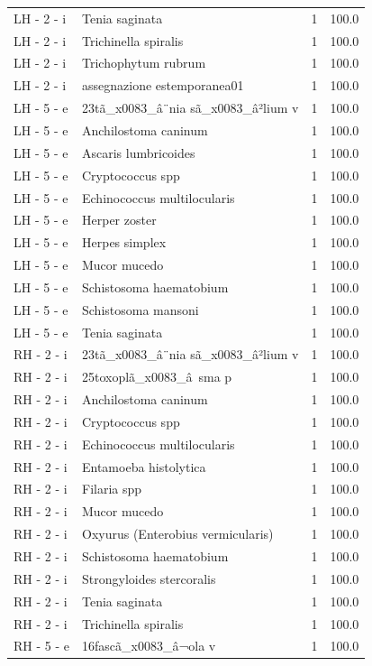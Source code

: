 \documentclass[a4paper,11pt]{article}
\begin{document}
\begin{footnotesize}
\begin{longtable}{p{3.5cm}p{7.5cm}rr}
LH - 2 - i & Tenia saginata & 1 & 100.0 \\
LH - 2 - i & Trichinella spiralis & 1 & 100.0 \\
LH - 2 - i & Trichophytum rubrum & 1 & 100.0 \\
LH - 2 - i & assegnazione estemporanea01 & 1 & 100.0 \\
LH - 5 - e & 23tã\_x0083\_â¨nia sã\_x0083\_â²lium v & 1 & 100.0 \\
LH - 5 - e & Anchilostoma caninum & 1 & 100.0 \\
LH - 5 - e & Ascaris lumbricoides & 1 & 100.0 \\
LH - 5 - e & Cryptococcus spp & 1 & 100.0 \\
LH - 5 - e & Echinococcus multilocularis & 1 & 100.0 \\
LH - 5 - e & Herper zoster & 1 & 100.0 \\
LH - 5 - e & Herpes simplex & 1 & 100.0 \\
LH - 5 - e & Mucor mucedo & 1 & 100.0 \\
LH - 5 - e & Schistosoma haematobium & 1 & 100.0 \\
LH - 5 - e & Schistosoma mansoni & 1 & 100.0 \\
LH - 5 - e & Tenia saginata & 1 & 100.0 \\
RH - 2 - i & 23tã\_x0083\_â¨nia sã\_x0083\_â²lium v & 1 & 100.0 \\
RH - 2 - i & 25toxoplã\_x0083\_â sma p & 1 & 100.0 \\
RH - 2 - i & Anchilostoma caninum & 1 & 100.0 \\
RH - 2 - i & Cryptococcus spp & 1 & 100.0 \\
RH - 2 - i & Echinococcus multilocularis & 1 & 100.0 \\
RH - 2 - i & Entamoeba histolytica & 1 & 100.0 \\
RH - 2 - i & Filaria spp & 1 & 100.0 \\
RH - 2 - i & Mucor mucedo & 1 & 100.0 \\
RH - 2 - i & Oxyurus (Enterobius vermicularis) & 1 & 100.0 \\
RH - 2 - i & Schistosoma haematobium & 1 & 100.0 \\
RH - 2 - i & Strongyloides stercoralis & 1 & 100.0 \\
RH - 2 - i & Tenia saginata & 1 & 100.0 \\
RH - 2 - i & Trichinella spiralis & 1 & 100.0 \\
RH - 5 - e & 16fascã\_x0083\_â¬ola v & 1 & 100.0 \\

\end{longtable}
\end{footnotesize}
\end{document}

